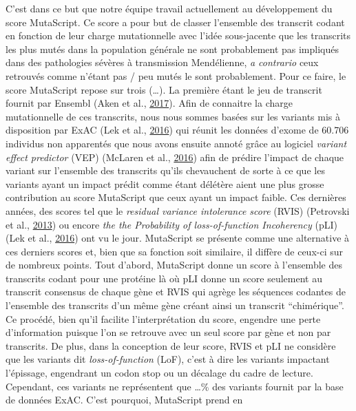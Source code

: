 \documentclass[12pt,twoside]{reedthesis}
\theoremstyle{definition}
\theoremstyle{definition}
\theoremstyle{remark}
\begin{document}
  C'est dans ce but que notre équipe travail actuellement au développement
  du score MutaScript. Ce score a pour but de classer l'ensemble des
  transcrit codant en fonction de leur charge mutationnelle avec l'idée
  sous-jacente que les transcrits les plus mutés dans la population
  générale ne sont probablement pas impliqués dans des pathologies sévères
  à transmission Mendélienne, \emph{a contrario} ceux retrouvés comme
  n'étant pas / peu mutés le sont probablement. Pour ce faire, le score
  MutaScript repose sur trois (\ldots{}). La première étant le jeu de
  transcrit fournit par Ensembl (Aken et al.,
  \protect\hyperlink{ref-Aken2017}{2017}). Afin de connaitre la charge
  mutationnelle de ces transcrits, nous nous sommes basées sur les
  variants mis à disposition par ExAC (Lek et al.,
  \protect\hyperlink{ref-Lek2016}{2016}) qui réunit les données d'exome de
  60.706 individus non apparentés que nous avons ensuite annoté grâce au
  logiciel \emph{variant effect predictor} (VEP) (McLaren et al.,
  \protect\hyperlink{ref-McLaren2016}{2016}) afin de prédire l'impact de
  chaque variant sur l'ensemble des transcrits qu'ils chevauchent de sorte
  à ce que les variants ayant un impact prédit comme étant délétère aient
  une plus grosse contribution au score MutaScript que ceux ayant un
  impact faible. Ces dernières années, des scores tel que le
  \emph{residual variance intolerance score} (RVIS) (Petrovski et al.,
  \protect\hyperlink{ref-Petrovski2013}{2013}) ou encore \emph{the the
  Probability of loss-of-function Incoherency} (pLI) (Lek et al.,
  \protect\hyperlink{ref-Lek2016}{2016}) ont vu le jour. MutaScript se
  présente comme une alternative à ces derniers scores et, bien que sa
  fonction soit similaire, il diffère de ceux-ci sur de nombreux points.
  Tout d'abord, MutaScript donne un score à l'ensemble des transcrits
  codant pour une protéine là où pLI donne un score seulement au transcrit
  consensus de chaque gène et RVIS qui agrège les séquences codantes de
  l'ensemble des transcrits d'un même gène créant ainsi un transcrit
  ``chimérique''. Ce procédé, bien qu'il facilite l'interprétation du
  score, engendre une perte d'information puisque l'on se retrouve avec un
  seul score par gène et non par transcrits. De plus, dans la conception
  de leur score, RVIS et pLI ne considère que les variants dit
  \emph{loss-of-function} (LoF), c'est à dire les variants impactant
  l'épissage, engendrant un codon stop ou un décalage du cadre de lecture.
  Cependant, ces variants ne représentent que \ldots{}\% des variants
  fournit par la base de données ExAC. C'est pourquoi, MutaScript prend en
\end{document}
